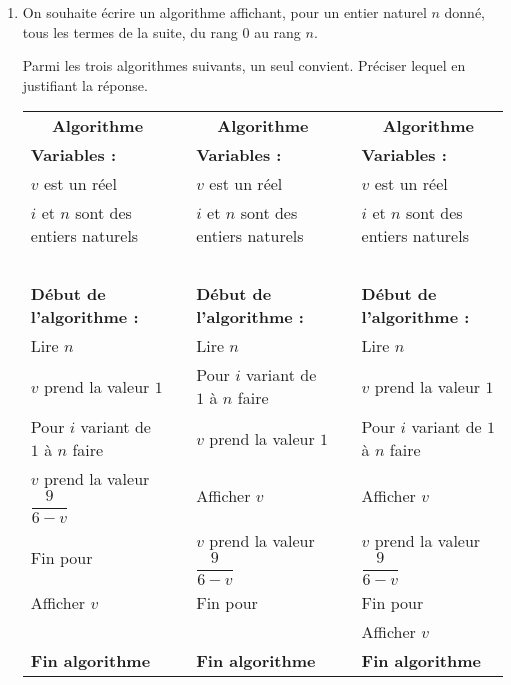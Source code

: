 \documentclass[10pt]{article}
\begin{document}
\begin{enumerate}
\item On souhaite écrire un algorithme  affichant, pour un entier naturel $n$ donné, tous les termes de la suite, du rang $0$ au rang $n$.
 
Parmi les trois algorithmes suivants, un seul convient. Préciser lequel en justifiant la réponse.

\medskip

\hspace{-1cm} 
\begin{small}
\begin{tabularx}{1.1\linewidth}{|X|c|X|c|X|}\cline{1-1}\cline{3-3}\cline{5-5}
\multicolumn{1}{|c|}{\textbf{Algorithme \No 1}}&&\multicolumn{1}{|c|}{\textbf{Algorithme \No 2}}&&\multicolumn{1}{|c|}{\textbf{Algorithme \No 3}}\\ \cline{1-1}\cline{3-3}\cline{5-5}
\textbf{Variables :}&&\textbf{Variables :}&&\textbf{Variables :}\\
$v$ est un réel&&$v$ est un réel&&$v$ est un réel\\ 
$i$ et $n$ sont des entiers naturels&&$i$ et $n$ sont des entiers naturels&&$i$ et $n$ sont des entiers naturels\\
~&&&&\\ 
\textbf{Début de l'algorithme :}&&\textbf{Début de l'algorithme :}&& \textbf{Début de l'algorithme :}\\ 
Lire $n$&&Lire $n$&&Lire $n$\\ 
$v$ prend la valeur $1$&&Pour $i$ variant de $1$ à $n$ faire&&$v$ prend la valeur $1$\\ 
Pour $i$ variant de $1$ à $n$ faire&&$v$ prend la valeur $1$&& Pour $i$ variant de $1$ à $n$ faire\\ 
\hspace{0.2cm}$v$ prend la valeur $\dfrac{9}{6 - v}$&&\hspace{0.2cm}Afficher $v$&& \hspace{0.2cm}Afficher $v$\\  
Fin pour&&$v$ prend la valeur $\dfrac{9}{6 - v}$&&$v$ prend la valeur $\dfrac{9}{6 - v}$\\
Afficher $v$&&Fin pour&&Fin pour\\
&&&&Afficher $v$\\
\textbf{Fin algorithme}&&\textbf{Fin algorithme}&&\textbf{Fin algorithme}\\  \cline{1-1}\cline{3-3}\cline{5-5}
\end{tabularx}
\end{small}


\end{enumerate}
\end{document}
